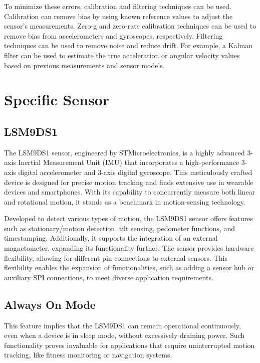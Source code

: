 To minimize these errors, calibration and filtering techniques can be used. Calibration can remove bias by using known reference values to adjust the sensor's measurements. Zero-g and zero-rate calibration techniques can be used to remove bias from accelerometers and gyroscopes, respectively. Filtering techniques can be used to remove noise and reduce drift. For example, a Kalman filter can be used to estimate the true acceleration or angular velocity values based on previous measurements and sensor models.\cite{Lin:2005}



\section{Specific Sensor }
\subsection{LSM9DS1}

The LSM9DS1 sensor, engineered by STMicroelectronics, is a highly advanced 3-axis Inertial Measurement Unit (IMU) that incorporates a high-performance 3-axis digital accelerometer and 3-axis digital gyroscope. This meticulously crafted device is designed for precise motion tracking and finds extensive use in wearable devices and smartphones. With its capability to concurrently measure both linear and rotational motion, it stands as a benchmark in motion-sensing technology. \cite{STMicroelectronics_LSM9DS1:2024}

Developed to detect various types of motion, the LSM9DS1 sensor offers features such as stationary/motion detection, tilt sensing, pedometer functions, and timestamping. Additionally, it supports the integration of an external magnetometer, expanding its functionality further. The sensor provides hardware flexibility, allowing for different pin connections to external sensors. This flexibility enables the expansion of functionalities, such as adding a sensor hub or auxiliary SPI connections, to meet diverse application requirements.

\subsection{Always On Mode}

This feature implies that the LSM9DS1 can remain operational continuously, even when a device is in sleep mode, without excessively draining power. Such functionality proves invaluable for applications that require uninterrupted motion tracking, like fitness monitoring or navigation systems. \cite{st_microelectronics:2024}

